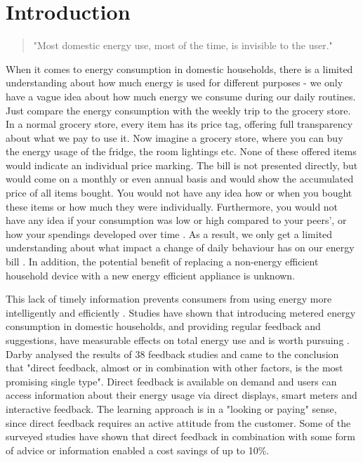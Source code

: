 
\chapter{Introduction}
\label{ch:Introduction}

\begin{quotation}
"Most domestic energy use, most of the time, is invisible to the user." 
\begin{flushright}
\cite{Darby2006}
\end{flushright}
\end{quotation}

When it comes to energy consumption in domestic households, there is a limited understanding about how much energy is used for different purposes - we only have a vague idea about how much energy we consume during our daily routines. Just compare the energy consumption with the weekly trip to the grocery store. In a normal grocery store, every item has its price tag, offering full transparency about what we pay to use it. Now imagine a grocery store, where you can buy the energy usage of the fridge, the room lightings etc. None of these offered items would indicate an individual price marking. The bill is not presented directly, but would come on a monthly or even annual basis and would show the accumulated price of all items bought. You would not have any idea how or when you bought these items or how much they were individually. Furthermore, you would not have any idea if your consumption was low or high compared to your peers', or how your spendings developed over time  \citep{Kempton1994}. As a result, we only get a limited understanding about what impact a change of daily behaviour has on our energy bill  \citep{Darby2006}. In addition, the potential benefit of replacing a non-energy efficient household device with a new energy efficient appliance is unknown.

This lack of timely information prevents consumers from using energy more intelligently and efficiently \citep{Darby2000}.
Studies have shown that introducing metered energy consumption in domestic households, and providing regular feedback and suggestions, have measurable effects on total energy use and is worth pursuing \citep{Darby2010}.  
Darby analysed the results of 38 feedback studies and came to the conclusion that "direct feedback, almost or in combination with other factors, is the most promising single type". Direct feedback is available on demand and users can access information about their energy usage via direct displays, smart meters and interactive feedback. The learning approach is in a "looking or paying" sense, since direct feedback requires an active attitude from the customer.
Some of the surveyed studies have shown that direct feedback in combination with some form of advice or information enabled a cost savings of up to 10\%.

